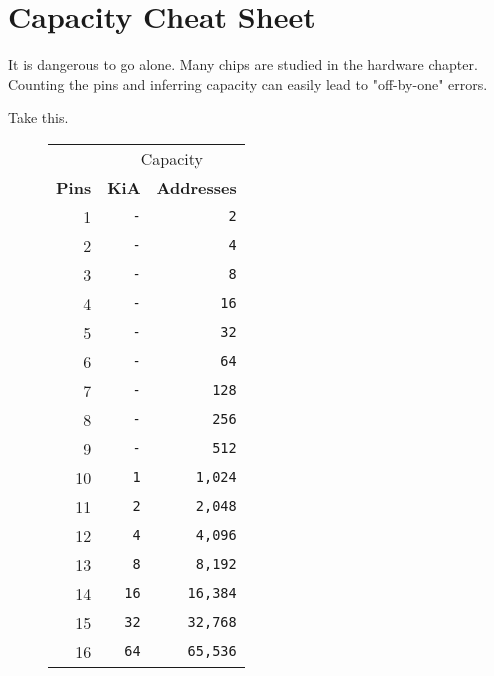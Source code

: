 \chapter*{Capacity Cheat Sheet}
It is dangerous to go alone. Many chips are studied in the hardware chapter. Counting the pins and inferring capacity can easily lead to "off-by-one" errors. 

Take this.

\begin{figure}[H]
\begin{minipage}[t]{0.49\linewidth}
{ 
\setlength{\tabcolsep}{3.0pt}
\setlength\cmidrulewidth{\heavyrulewidth} %
\begin{tabular}{rrr}

  & \multicolumn{2}{c}{Capacity} \\
  \cmidrule(lr){2-3}
  
 
  \textbf{Pins} & \textbf{KiA} & \textbf{Addresses}\\               
            
  \toprule    
1            &    \texttt{-} &      \texttt{2}   \\
2   &\texttt{-}            &      \texttt{4}   \\
3  &    \texttt{-} &      \texttt{8}   \\
4  &\texttt{-}            &      \texttt{16}   \\
5  &    \texttt{-} &      \texttt{32}   \\
6   &    \texttt{-} &      \texttt{64}   \\
7   &    \texttt{-} &      \texttt{128}   \\
8            &    \texttt{-} &      \texttt{256}   \\
9           &    \texttt{-} &      \texttt{512}   \\
10   &    \texttt{1}           &      \texttt{1,024} \\
11   &    \texttt{2}           &\texttt{2,048}    \\
12   &    \texttt{4}           &      \texttt{4,096} \\
13   &    \texttt{8}          &      \texttt{8,192} \\
14            &    \texttt{16}           &      \texttt{16,384} \\
15  &    \texttt{32}           &\texttt{32,768}    \\
  16  &    \texttt{64}           &\texttt{65,536}    \\


\end{tabular}}
\end{minipage}
\end{figure}

